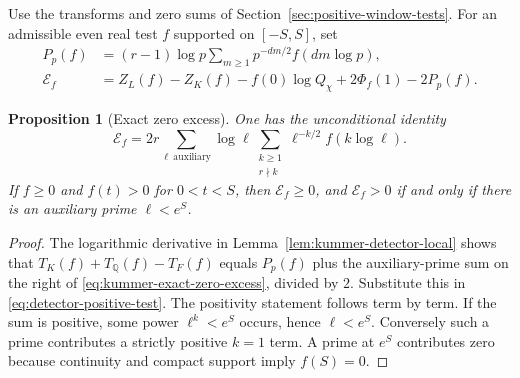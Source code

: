 \documentclass[11pt]{article}
\newtheorem{proposition}[theorem]{Proposition}
\theoremstyle{definition}
\theoremstyle{remark}
\begin{document}
Use the transforms and zero sums of
Section~\ref{sec:positive-window-tests}.  For an admissible
even real test $f$ supported on $[-S,S]$, set
\begin{align*}
 P_p(f)&=(r-1)\log p\sum_{m\geq1}p^{-dm/2}f(dm\log p),\\
 \mathcal E_f&=Z_L(f)-Z_K(f)-f(0)\log Q_\chi
                  +2\Phi_f(1)-2P_p(f).
\end{align*}

\begin{proposition}[Exact zero excess]
\label{prop:kummer-exact-zero-excess}
One has the unconditional identity
\begin{equation}\label{eq:kummer-exact-zero-excess}
 \mathcal E_f
 =2r\sum_{\ell\ \mathrm{auxiliary}}\log\ell
      \sum_{\substack{k\geq1\\r\nmid k}}
            \ell^{-k/2}f(k\log\ell).
\end{equation}
If $f\geq0$ and $f(t)>0$ for $0<t<S$, then
$\mathcal E_f\geq0$, and $\mathcal E_f>0$ if and only if
there is an auxiliary prime $\ell<e^S$.
\end{proposition}
\begin{proof}
The logarithmic derivative in
Lemma~\ref{lem:kummer-detector-local} shows that
$T_K(f)+T_{\mathbb Q}(f)-T_F(f)$ equals $P_p(f)$ plus
the auxiliary-prime sum on the right of
\eqref{eq:kummer-exact-zero-excess}, divided by $2$.
Substitute this in \eqref{eq:detector-positive-test}.
The positivity statement follows term by term.  If the sum
is positive, some power $\ell^k<e^S$ occurs, hence
$\ell<e^S$.  Conversely such a prime contributes a strictly
positive $k=1$ term.  A prime at $e^S$ contributes zero
because continuity and compact support imply $f(S)=0$.
\end{proof}
\end{document}
